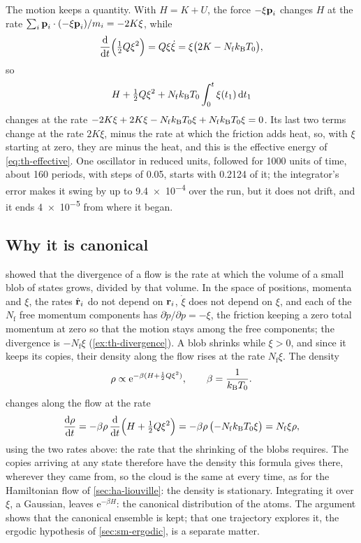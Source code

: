 The motion keeps a quantity. With $H = K + U$, the force $-\xi\bm{\mathrm{p}}_i$
changes $H$ at the rate $\sum_i\bm{\mathrm{p}}_i\cdot(-\xi\bm{\mathrm{p}}_i)/m_i = -2K\xi$,
while
\begin{equation*}
   \frac{\mathrm{d}}{\mathrm{d} t}\Bigl(\tfrac12Q\xi^2\Bigr) = Q\xi\dot\xi
   = \xi\bigl(2K - N_{\mathrm f}k_{\mathrm{B}} T_0\bigr) ,
\end{equation*}
so
\begin{equation*}
   H + \tfrac12Q\xi^2 + N_{\mathrm f}k_{\mathrm{B}} T_0\int_0^t\xi(t_1)\,\mathrm{d} t_1
\end{equation*}
changes at the rate $-2K\xi + 2K\xi - N_{\mathrm f}k_{\mathrm{B}} T_0\xi +
N_{\mathrm f}k_{\mathrm{B}} T_0\xi = 0$. Its last two terms change at the rate
$2K\xi$, minus the rate at which the friction adds heat, so, with $\xi$
starting at zero, they are minus the heat, and this is the effective
energy of \cref{eq:th-effective}. One oscillator in reduced units,
followed for 1000 units of time, about 160 periods, with steps of 0.05,
starts with 0.2124 of it; the integrator's error makes it swing by up to
\num{9.4e-4} over the run, but it does not drift, and it ends
\num{4e-5} from where it began.

\subsection*{Why it is canonical}

 showed that the divergence of a flow is the rate
at which the volume of a small blob of states grows, divided by that
volume. In the space of positions, momenta and $\xi$, the rates
$\dot{\bm{\mathrm{r}}}_i$ do not depend on $\bm{\mathrm{r}}_i$, $\dot\xi$ does not depend on
$\xi$, and each of the $N_{\mathrm f}$ free momentum components has
$\partial\dot p/\partial p = -\xi$, the friction keeping a zero total
momentum at zero so that the motion stays among the free components; the
divergence is $-N_{\mathrm f}\xi$ (\cref{ex:th-divergence}).
A blob shrinks while $\xi > 0$, and since it keeps its copies, their
density along the flow rises at the rate $N_{\mathrm f}\xi$. The density
\begin{equation*}
   \rho \propto \mathrm{e}^{-\beta(H + \frac12Q\xi^2)} , \qquad
   \beta = \frac{1}{k_{\mathrm{B}} T_0} .
\end{equation*}
changes along the flow at the rate
\begin{equation*}
   \frac{\mathrm{d}\rho}{\mathrm{d} t} = -\beta\rho\,\frac{\mathrm{d}}{\mathrm{d} t}\Bigl(H +
   \tfrac12Q\xi^2\Bigr) = -\beta\rho\,\bigl(-N_{\mathrm f}k_{\mathrm{B}} T_0\xi\bigr)
   = N_{\mathrm f}\xi\rho ,
\end{equation*}
using the two rates above: the rate that the shrinking of the blobs
requires. The copies arriving at any state therefore have the density
this formula gives there, wherever they came from, so the cloud is the
same at every time, as for the Hamiltonian flow of
\cref{sec:ha-liouville}: the density is stationary. Integrating it over
$\xi$, a Gaussian, leaves
$\mathrm{e}^{-\beta H}$: the canonical distribution of the atoms. The
argument shows that the canonical ensemble is kept; that one trajectory
explores it, the ergodic hypothesis of \cref{sec:sm-ergodic}, is a
separate matter.

